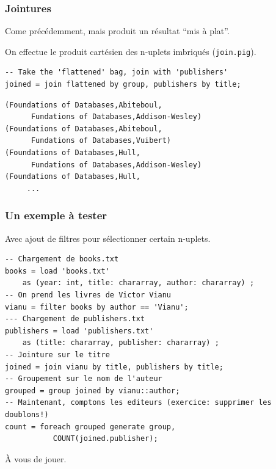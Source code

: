 \begin{frame}[fragile]
\frametitle{Jointures}
\vfill
Come précédemment, mais produit un résultat ``mis à plat''. 

\vfill

On
effectue le produit cartésien des n-uplets imbriqués (\texttt{join.pig}).

\vfill

\begin{verbatim}
-- Take the 'flattened' bag, join with 'publishers'
joined = join flattened by group, publishers by title;
\end{verbatim}

\vfill

{\small\begin{verbatim}
(Foundations of Databases,Abiteboul,
      Fundations of Databases,Addison-Wesley)
(Foundations of Databases,Abiteboul,
      Fundations of Databases,Vuibert)
(Foundations of Databases,Hull,
      Fundations of Databases,Addison-Wesley)
(Foundations of Databases,Hull,
     ...
\end{verbatim}
}

\end{frame}


\begin{frame}[fragile]
\frametitle{Un exemple à tester}
\vfill
Avec ajout de filtres pour sélectionner certain n-uplets.


\vfill
               
\begin{verbatim}
-- Chargement de books.txt
books = load 'books.txt' 
    as (year: int, title: chararray, author: chararray) ;
-- On prend les livres de Victor Vianu
vianu = filter books by author == 'Vianu';
--- Chargement de publishers.txt
publishers = load 'publishers.txt' 
    as (title: chararray, publisher: chararray) ;
-- Jointure sur le titre
joined = join vianu by title, publishers by title;
-- Groupement sur le nom de l'auteur
grouped = group joined by vianu::author;
-- Maintenant, comptons les editeurs (exercice: supprimer les doublons!)
count = foreach grouped generate group, 
           COUNT(joined.publisher);
\end{verbatim}

À vous de jouer.

\end{frame}

